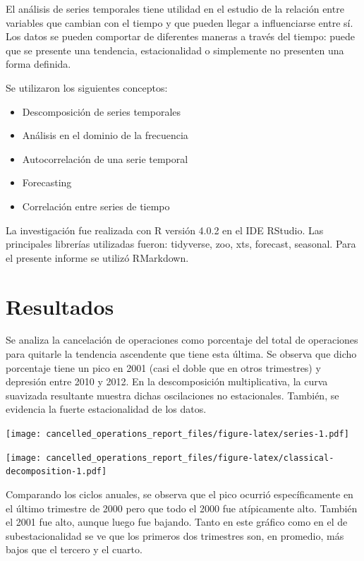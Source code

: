 \documentclass[
]{article}
\providecommand{\tightlist}{%
  \setlength{\itemsep}{0pt}\setlength{\parskip}{0pt}}
\begin{document}
El análisis de series temporales tiene utilidad en el estudio de la
relación entre variables que cambian con el tiempo y que pueden llegar a
influenciarse entre sí. Los datos se pueden comportar de diferentes
maneras a través del tiempo: puede que se presente una tendencia,
estacionalidad o simplemente no presenten una forma definida.

Se utilizaron los siguientes conceptos:

\begin{itemize}
\tightlist
\item
  Descomposición de series temporales
\item
  Análisis en el dominio de la frecuencia
\item
  Autocorrelación de una serie temporal
\item
  Forecasting
\item
  Correlación entre series de tiempo
\end{itemize}

La investigación fue realizada con R versión 4.0.2 en el IDE RStudio.
Las principales librerías utilizadas fueron: tidyverse, zoo, xts,
forecast, seasonal. Para el presente informe se utilizó RMarkdown.

\hypertarget{resultados}{%
\section{Resultados}\label{resultados}}

Se analiza la cancelación de operaciones como porcentaje del total de
operaciones para quitarle la tendencia ascendente que tiene esta última.
Se observa que dicho porcentaje tiene un pico en 2001 (casi el doble que
en otros trimestres) y depresión entre 2010 y 2012. En la descomposición
multiplicativa, la curva suavizada resultante muestra dichas
oscilaciones no estacionales. También, se evidencia la fuerte
estacionalidad de los datos.

\texttt{[image: cancelled\_operations\_report\_files/figure-latex/series-1.pdf]}

\texttt{[image: cancelled\_operations\_report\_files/figure-latex/classical-decomposition-1.pdf]}

Comparando los ciclos anuales, se observa que el pico ocurrió
específicamente en el último trimestre de 2000 pero que todo el 2000 fue
atípicamente alto. También el 2001 fue alto, aunque luego fue bajando.
Tanto en este gráfico como en el de subestacionalidad se ve que los
primeros dos trimestres son, en promedio, más bajos que el tercero y el
cuarto.
\end{document}
